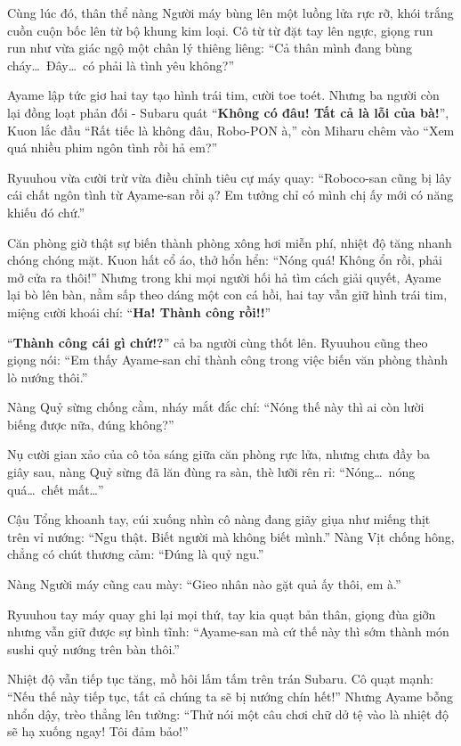 \documentclass[../main.tex]{subfiles}
\begin{document}
Cùng lúc đó, thân thể nàng Người máy bùng lên một luồng lửa rực rỡ, khói trắng cuồn cuộn bốc lên từ bộ khung kim loại. Cô từ từ đặt tay lên ngực, giọng run run như vừa giác ngộ một chân lý thiêng liêng: ``Cả thân mình đang bùng cháy\dots\ Đây\dots\ có phải là tình yêu không?''

Ayame lập tức giơ hai tay tạo hình trái tim, cười toe toét. Nhưng ba người còn lại đồng loạt phản đối - Subaru quát ``\textbf{Không có đâu! Tất cả là lỗi của bà!}'', Kuon lắc đầu ``Rất tiếc là không đâu, Robo-PON à,'' còn Miharu chêm vào ``Xem quá nhiều phim ngôn tình rồi hả em?''

Ryuuhou vừa cười trừ vừa điều chỉnh tiêu cự máy quay: ``Roboco-san cũng bị lây cái chất ngôn tình từ Ayame-san rồi ạ? Em tưởng chỉ có mình chị ấy mới có năng khiếu đó chứ.''


Căn phòng giờ thật sự biến thành phòng xông hơi miễn phí, nhiệt độ tăng nhanh chóng chóng mặt. Kuon hất cổ áo, thở hổn hển: ``Nóng quá! Không ổn rồi, phải mở cửa ra thôi!'' Nhưng trong khi mọi người hối hả tìm cách giải quyết, Ayame lại bò lên bàn, nằm sấp theo dáng một con cá hồi, hai tay vẫn giữ hình trái tim, miệng cười khoái chí: ``\textbf{Ha! Thành công rồi!!}''

``\textbf{Thành công cái gì chứ!?}'' cả ba người cùng thốt lên. Ryuuhou cũng theo giọng nói: ``Em thấy Ayame-san chỉ thành công trong việc biến văn phòng thành lò nướng thôi.''

Nàng Quỷ sừng chống cằm, nháy mắt đắc chí: ``Nóng thế này thì ai còn lười biếng được nữa, đúng không?''


Nụ cười gian xảo của cô tỏa sáng giữa căn phòng rực lửa, nhưng chưa đầy ba giây sau, nàng Quỷ sừng đã lăn đùng ra sàn, thè lưỡi rên rỉ: ``Nóng\dots\ nóng quá\dots\ chết mất\dots''

Cậu Tổng khoanh tay, cúi xuống nhìn cô nàng đang giãy giụa như miếng thịt trên vỉ nướng: ``Ngu thật. Biết người mà không biết mình.'' Nàng Vịt chống hông, chẳng có chút thương cảm: ``Đúng là quỷ ngu.''

Nàng Người máy cũng cau mày: ``Gieo nhân nào gặt quả ấy thôi, em à.''

Ryuuhou tay máy quay ghi lại mọi thứ, tay kia quạt bản thân, giọng đùa giỡn nhưng vẫn giữ được sự bình tĩnh: ``Ayame-san mà cứ thế này thì sớm thành món sushi quỷ nướng trên bàn thôi.''


Nhiệt độ vẫn tiếp tục tăng, mồ hôi lấm tấm trên trán Subaru. Cô quạt mạnh: ``Nếu thế này tiếp tục, tất cả chúng ta sẽ bị nướng chín hết!'' Nhưng Ayame bỗng nhổn dậy, trèo thẳng lên tường: ``Thử nói một câu chơi chữ dở tệ vào là nhiệt độ sẽ hạ xuống ngay! Tôi đảm bảo!''
\end{document}
